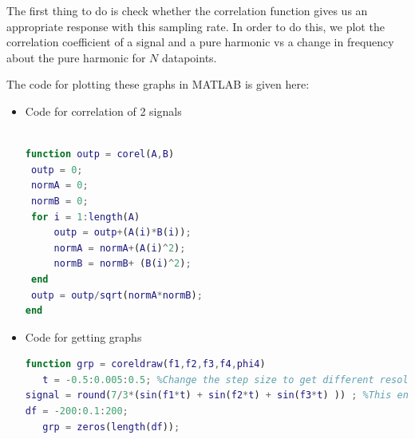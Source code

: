 The first thing to do is check whether the correlation function gives us an
appropriate response with this sampling rate. In order to do this, we plot the
correlation coefficient of a signal and a pure harmonic vs a change in frequency
about the pure harmonic for \(N\) datapoints. 

The code for plotting these graphs in MATLAB is given here: \\
\begin{itemize}
    \item Code for correlation of 2 signals
\begin{lstlisting}[language=Matlab]
    
function outp = corel(A,B)
 outp = 0;
 normA = 0;
 normB = 0;
 for i = 1:length(A)
     outp = outp+(A(i)*B(i));
     normA = normA+(A(i)^2);
     normB = normB+ (B(i)^2);
 end
 outp = outp/sqrt(normA*normB);
end
\end{lstlisting} 

\item Code for getting graphs
\begin{lstlisting}[language=Matlab]
    function grp = coreldraw(f1,f2,f3,f4,phi4)
   t = -0.5:0.005:0.5; %Change the step size to get different resolutions
signal = round(7/3*(sin(f1*t) + sin(f2*t) + sin(f3*t) )) ; %This ensures we have a number between \(\pm7\)
df = -200:0.1:200;
   grp = zeros(length(df));


\end{lstlisting}
\end{itemize}
